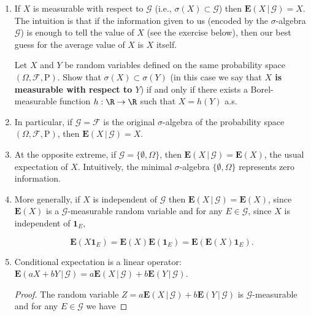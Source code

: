 \begin{enumerate}[label=\arabic*.]
\item If $X$ is measurable with respect to $\mathcal{G}$
(i.e., $\sigma(X) \subset \mathcal{G}$) then
$\mathbf{E}\left(X\,|\,\mathcal{G}\right) = X$. The
intuition is that if the information given to us
(encoded by the $\sigma$-algebra $\mathcal{G}$) is
enough to tell the value of $X$ (see the exercise
below), then our best guess for the average value of
$X$ is $X$ itself.

\begin{xexercise}
Let $X$ and $Y$ be random variables defined on the
same probability space
$(\Omega, \mathcal{F}, \mathrm{P})$. Show that
$\sigma(X) \subset \sigma(Y)$ (in this case we say
that \textbf{$X$ is measurable with respect to $Y$}) if and
only if there exists a Borel-measurable function
$h:\R\to\R$ such that $X=h(Y)$ a.s.
\end{xexercise}

\item In particular, if $\mathcal{G}=\mathcal{F}$ is the
original $\sigma$-algebra of the probability space
$(\Omega, \mathcal{F}, \mathrm{P})$, then
$\mathbf{E}\left(X\,|\,\mathcal{G}\right) = X$.

\item At the opposite extreme, if
$\mathcal{G}= \{ \emptyset, \Omega \}$, then
$\mathbf{E}\left(X\,|\,\mathcal{G}\right) =
\mathbf{E}(X)$,
the usual expectation of $X$. Intuitively, the
minimal $\sigma$-algebra $\{\emptyset, \Omega\}$
represents zero information.

\item More generally, if $X$ is independent of $\mathcal{G}$
then
$\mathbf{E}\left(X\,|\,\mathcal{G}\right)=\mathbf{E}(X)$,
since $\mathbf{E}(X)$ is a $\mathcal{G}$-measurable
random variable and for any $E\in\mathcal{G}$, since
$X$ is independent of $\mathbf{1}_E$,

\[
\mathbf{E}(X\mathbf{1}_E) = \mathbf{E}(X)\mathbf{E}(\mathbf{1}_E) = \mathbf{E}(\mathbf{E}(X)\mathbf{1}_E).
\]

\item Conditional expectation is a linear operator:
$\mathbf{E}\left(aX+bY\,|\,\mathcal{G}\right) = a
\mathbf{E}\left(X\,|\,\mathcal{G}\right) + b
\mathbf{E}\left(Y\,|\,\mathcal{G}\right).$

\begin{proof}
The random variable
$Z=a \mathbf{E}\left(X\,|\,\mathcal{G}\right) + b
\mathbf{E}\left(Y\,|\,\mathcal{G}\right)$
is $\mathcal{G}$-measurable and for any
$E\in\mathcal{G}$ we have


\end{proof}
\end{enumerate}
